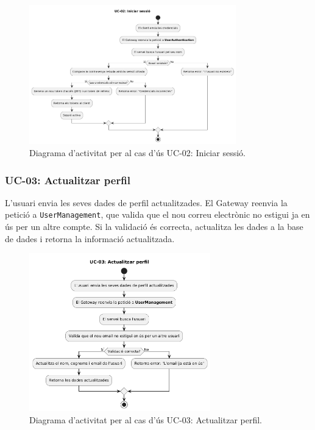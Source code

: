 \begin{figure}[H]
    \centering
    \includegraphics[width=0.8\textwidth]{Figures/ad_UC02.png}
    \caption{Diagrama d'activitat per al cas d'ús UC-02: Iniciar sessió.}
    \label{fig:ad_uc02_app}
\end{figure}

\subsubsection{UC-03: Actualitzar perfil}
L'usuari envia les seves dades de perfil actualitzades. El Gateway reenvia la petició a \texttt{UserManagement}, que valida que el nou correu electrònic no estigui ja en ús per un altre compte. Si la validació és correcta, actualitza les dades a la base de dades i retorna la informació actualitzada.

\begin{figure}[H]
    \centering
    \includegraphics[width=0.7\textwidth]{Figures/ad_UC03.png}
    \caption{Diagrama d'activitat per al cas d'ús UC-03: Actualitzar perfil.}
    \label{fig:ad_uc03_app}
\end{figure}

